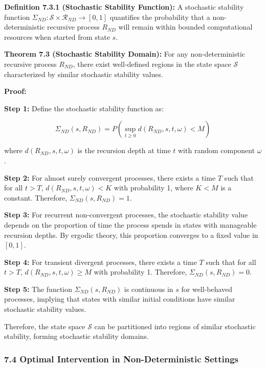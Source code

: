 \documentclass[
]{article}
\begin{document}
\textbf{Definition 7.3.1 (Stochastic Stability Function):} A stochastic
stability function
\(\Sigma_{ND}: \mathcal{S} \times \mathcal{R}_{ND} \rightarrow [0,1]\)
quantifies the probability that a non-deterministic recursive process
\(R_{ND}\) will remain within bounded computational resources when
started from state \(s\).

\textbf{Theorem 7.3 (Stochastic Stability Domain):} For any
non-deterministic recursive process \(R_{ND}\), there exist well-defined
regions in the state space \(\mathcal{S}\) characterized by similar
stochastic stability values.

\textbf{Proof:}

\textbf{Step 1:} Define the stochastic stability function as:

\[\Sigma_{ND}(s, R_{ND}) = P(\sup_{t \geq 0} d(R_{ND}, s, t, \omega) < M)\]

where \(d(R_{ND}, s, t, \omega)\) is the recursion depth at time \(t\)
with random component \(\omega\).

\textbf{Step 2:} For almost surely convergent processes, there exists a
time \(T\) such that for all \(t > T\), \(d(R_{ND}, s, t, \omega) < K\)
with probability 1, where \(K < M\) is a constant. Therefore,
\(\Sigma_{ND}(s, R_{ND}) = 1\).

\textbf{Step 3:} For recurrent non-convergent processes, the stochastic
stability value depends on the proportion of time the process spends in
states with manageable recursion depths. By ergodic theory, this
proportion converges to a fixed value in \([0,1]\).

\textbf{Step 4:} For transient divergent processes, there exists a time
\(T\) such that for all \(t > T\), \(d(R_{ND}, s, t, \omega) \geq M\)
with probability 1. Therefore, \(\Sigma_{ND}(s, R_{ND}) = 0\).

\textbf{Step 5:} The function \(\Sigma_{ND}(s, R_{ND})\) is continuous
in \(s\) for well-behaved processes, implying that states with similar
initial conditions have similar stochastic stability values.

Therefore, the state space \(\mathcal{S}\) can be partitioned into
regions of similar stochastic stability, forming stochastic stability
domains.

\subsubsection{7.4 Optimal Intervention in Non-Deterministic
Settings}\label{optimal-intervention-in-non-deterministic-settings}
\end{document}
